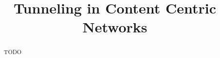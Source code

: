 \documentclass[conference]{sig-alternate-05-2015}
\begin{document}
\title{Tunneling in Content Centric Networks}
\author{
\alignauthor
}


\maketitle
\pagestyle{plain}

\begin{abstract}
TODO
\end{abstract}

%




\end{document}
